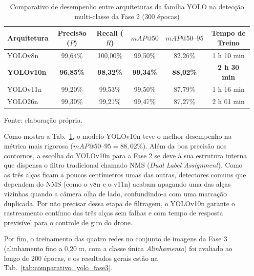 \begin{table}[H]
	\centering
	\small
	\setlength{\tabcolsep}{5pt}
	\captionsetup{justification=centering}
	\caption{Comparativo de desempenho entre arquiteturas da família YOLO na detecção multi-classe da Fase 2 (300 épocas)}
	\label{tab:comparativo_yolo_fase2}
	\vspace{0.2cm}
	\begin{tabular}{lccccc}
		\hline
		\textbf{Arquitetura} & \textbf{Precisão ($P$)} & \textbf{Recall ($R$)} & \textbf{$mAP@50$} & \textbf{$mAP@50\text{--}95$} & \textbf{Tempo de Treino} \\
		\hline
		YOLOv8n  & 99,64\% & 100,00\% & 99,50\% & 82,26\% & 1 h 10 min \\
		\textbf{YOLOv10n} & \textbf{96,85\%} & \textbf{98,32\%} & \textbf{99,34\%} & \textbf{88,02\%} & \textbf{2 h 30 min} \\
		YOLOv11n & 99,20\% & 99,53\%  & 99,50\% & 87,79\% & 1 h 16 min \\
		YOLO26n  & 99,30\% & 99,21\%  & 99,47\% & 87,27\% & 2 h 01 min \\
		\hline
	\end{tabular}
	\vspace{0.2cm}
	\begin{flushleft}
		\footnotesize Fonte: elaboração própria.
	\end{flushleft}
\end{table}

Como mostra a Tab.~\ref{tab:comparativo_yolo_fase2}, o modelo YOLOv10n teve o melhor desempenho na métrica mais rigorosa ($mAP@50\text{--}95 = 88,02\%$). Além da boa precisão nos contornos, a escolha do YOLOv10n para a Fase 2 se deve à sua estrutura interna que dispensa o filtro tradicional chamado NMS (\textit{Dual Label Assignment}). Como as três alças ficam a poucos centímetros umas das outras, detectores comuns que dependem do NMS (como o v8n e o v11n) acabam apagando uma das alças vizinhas quando a câmera olha de lado, confundindo-a com uma marcação duplicada. Por não precisar dessa etapa de filtragem, o YOLOv10n garante o rastreamento contínuo das três alças sem falhas e com tempo de resposta previsível para o controle de giro do drone.

Por fim, o treinamento das quatro redes no conjunto de imagens da Fase 3 (alinhamento fino a 0,20 m, com a classe única \textit{Alinhamento}) foi avaliado ao longo de 200 épocas, e os resultados gerais estão na Tab.~\ref{tab:comparativo_yolo_fase3}.

